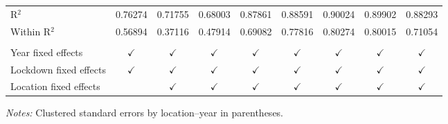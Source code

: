\begin{tabular}{lcccccccc}
   R$^2$                           & 0.76274        & 0.71755        & 0.68003       & 0.87861        & 0.88591        & 0.90024        & 0.89902        & 0.88293\\
   Within R$^2$                    & 0.56894        & 0.37116        & 0.47914       & 0.69082        & 0.77816        & 0.80274        & 0.80015        & 0.71054\\
                                   &                &                &               &                &                &                &                &  \\
   Year fixed effects              & $\checkmark$  & $\checkmark$  & $\checkmark$ & $\checkmark$  & $\checkmark$  & $\checkmark$  & $\checkmark$  & $\checkmark$\\
   Lockdown fixed effects          & $\checkmark$  & $\checkmark$  & $\checkmark$ & $\checkmark$  & $\checkmark$  & $\checkmark$  & $\checkmark$  & $\checkmark$\\
   Location fixed effects          &                & $\checkmark$  & $\checkmark$ & $\checkmark$  & $\checkmark$  & $\checkmark$  & $\checkmark$  & $\checkmark$\\
   \bottomrule
\end{tabular}
 
\medskip \emph{Notes:} Clustered standard errors by location--year in parentheses.


